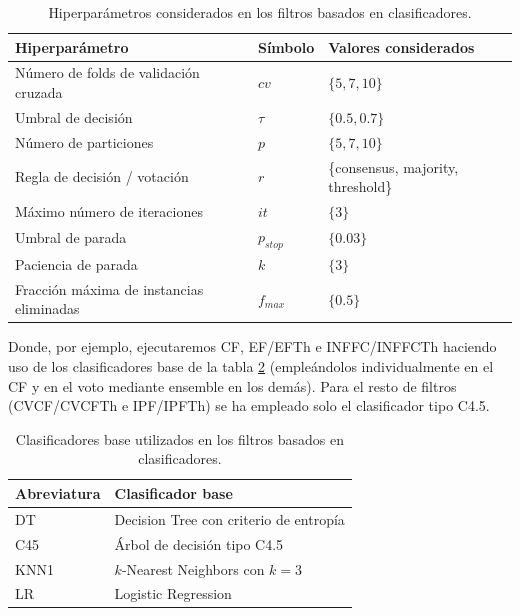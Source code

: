 \documentclass[print, color]{ugrTFG}
\begin{document}
    \begin{table}[htbp]
        \centering
        \begin{tabular}{lll}
        \hline
        \textbf{Hiperparámetro} & \textbf{Símbolo} & \textbf{Valores considerados} \\
        \hline
        Número de folds de validación cruzada & $cv$ & $\{5,7,10\}$ \\
        Umbral de decisión & $\tau$ & $\{0.5,0.7\}$ \\
        Número de particiones & $p$ & $\{5,7,10\}$ \\
        Regla de decisión / votación & $r$ & \{consensus, majority, threshold\} \\
        Máximo número de iteraciones & $it$ & $\{3\}$ \\
        Umbral de parada & $p_{stop}$ & $\{0.03\}$ \\
        Paciencia de parada & $k$ & $\{3\}$ \\
        Fracción máxima de instancias eliminadas & $f_{max}$ & $\{0.5\}$ \\
        \hline
        \end{tabular}
        \caption{Hiperparámetros considerados en los filtros basados en clasificadores.}
        \label{tab:hiperparametros_clasificadores}
    \end{table}

    Donde, por ejemplo, ejecutaremos CF, EF/EFTh e INFFC/INFFCTh haciendo uso de los clasificadores base de la tabla \ref{tab:clasificadores_base} (empleándolos individualmente en el CF y en el voto mediante ensemble en los demás). Para el resto de filtros (CVCF/CVCFTh e IPF/IPFTh) se ha empleado solo el clasificador tipo C4.5.\\

    \begin{table}[htbp]
        \centering
        \begin{tabular}{ll}
        \hline
        \textbf{Abreviatura} & \textbf{Clasificador base} \\ \hline
        DT    & Decision Tree con criterio de entropía \\
        C45   & Árbol de decisión tipo C4.5 \\
        KNN1  & $k$-Nearest Neighbors con $k=3$ \\
        LR    & Logistic Regression \\
        \hline
        \end{tabular}
        \caption{Clasificadores base utilizados en los filtros basados en clasificadores.}
        \label{tab:clasificadores_base}
    \end{table}
\end{document}
